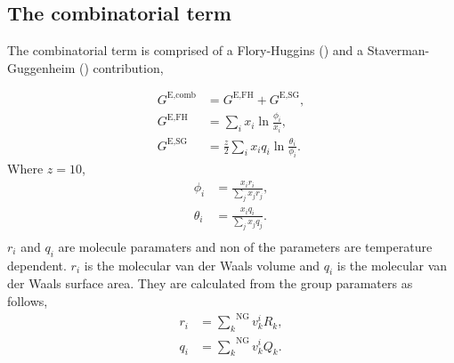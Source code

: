 \documentclass[internal,english]{sintefmemo2012}
\newcommand*{\ousum}[2]{\overset{#1}{\underset{#2}{\sum}}}
\newcommand{\excess}{\text{E}\xspace}
\newcommand{\comb}{\text{comb}\xspace}
\newcommand{\FH}{\text{FH}\xspace}
\newcommand{\SG}{\text{SG}\xspace}
\newcommand{\NGr}{\text{NG}\xspace}
\begin{document}
\subsection{The combinatorial term}
The combinatorial term is comprised of a Flory-Huggins (\FH) and a
Staverman-Guggenheim (\SG) contribution,

\begin{align}
  G^{\excess,\comb} &= G^{\excess,\FH} + G^{\excess,\SG},\label{eq:comb}\\
  G^{\excess,\FH} &= \underset{i}{\sum} x_i \ln \frac{\phi_i}{x_i}, \label{eq:fh}\\
  G^{\excess,\SG} &= \frac{z}{2} \underset{i}{\sum} x_i q_i \ln \frac{\theta_i}{\phi_i}\label{eq:sg}.
\end{align}
Where $z=10$,
\begin{align}
  \phi_i &= \frac{x_i r_i}{\underset{j}{\sum} x_j r_j},\label{eq:phii}\\
  \theta_i &= \frac{x_i q_i}{\underset{j}{\sum} x_j q_j}.\label{eq:thetai}\\
\end{align}
$r_i$ and $q_i$ are molecule paramaters and non of the parameters are temperature dependent. $r_i$ is the molecular van der Waals volume and $q_i$ is the molecular van der Waals surface area. They are calculated from the group paramaters as follows,
\begin{align}
  r_i &= \ousum{\NGr}{k}v_k^i R_k,\label{eq:ri}\\
  q_i &= \ousum{\NGr}{k}v_k^i Q_k.\label{eq:qi}\\
\end{align}
\end{document}
